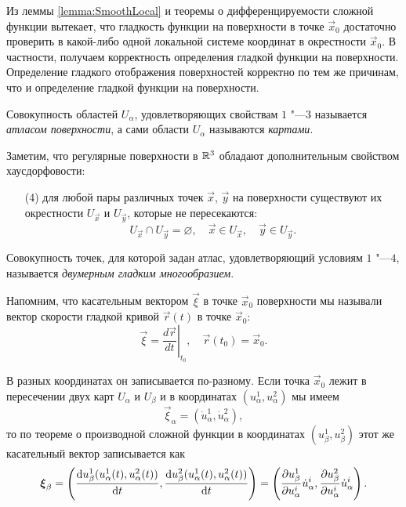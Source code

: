 Из леммы \ref{lemma:SmoothLocal} и теоремы о дифференцируемости сложной функции вытекает, что гладкость функции на поверхности в точке $\vec{x}_0$ достаточно проверить в какой-либо одной локальной системе координат в окрестности $\vec{x}_0$. В частности, получаем корректность определения гладкой функции на поверхности. Определение гладкого отображения поверхностей корректно по тем же причинам, что и определение гладкой функции на поверхности.

\begin{definition}
	Совокупность областей $U_\alpha$, удовлетворяющих свойствам $1$ "---$3$ называется \textit{атласом поверхности}, а сами области $U_\alpha$ называются \textit{картами}.
\end{definition}

Заметим, что регулярные поверхности в $\mathbb{R}^3$ обладают дополнительным свойством хаусдорфовости:
\begin{enumerate}[nolistsep, label=(\arabic*)]
	\item[(4)] для любой пары различных точек $\vec{x}$, $\vec{y}$ на поверхности существуют их окрестности $U_{\vec{x}}$ и $U_{\vec{y}}$, которые не пересекаются:
		\[
			U_{\vec{x}} \cap U_{\vec{y}} = \varnothing,\quad \vec{x} \in U_{\vec{x}},\quad \vec{y} \in U_{\vec{y}}.
		\]
\end{enumerate}

\begin{definition}
	Совокупность точек, для которой задан атлас, удовлетворяющий условиям $1$ "---$4$, называется \textit{двумерным гладким многообразием}.
\end{definition}

Напомним, что касательным вектором $\vec{\xi}$ в точке $\vec{x}_0$ поверхности мы называли вектор скорости гладкой кривой $\vec{r}(t)$ в точке $\vec{x}_0$:
\[
	\vec{\xi} = \left.\frac{d\vec{r}}{dt}\right|_{t_0},\quad \vec{r}(t_0) = \vec{x}_0.
\]

В разных координатах он записывается по-разному. Если точка $\vec{x}_0$ лежит в пересечении двух карт $U_\alpha$ и $U_\beta$ и в координатах $(u_\alpha^1, u_\alpha^2)$ мы имеем
\[
	\vec{\xi}_\alpha = (\dot{u}^1_\alpha, \dot{u}^2_\alpha),
\]
то по теореме о производной сложной функции в координатах $(u_\beta^1, u_\beta^2)$ этот же касательный вектор записывается как
\[
	\boldsymbol{\xi}_\beta = \left(\frac{\mathop{}\!\mathrm{d} u_\beta^1(u_\alpha^1(t), u_\alpha^2(t))}{\mathop{}\!\mathrm{d} t}, \frac{\mathop{}\!\mathrm{d} u_\beta^2(u_\alpha^1(t), u_\alpha^2(t))}{\mathop{}\!\mathrm{d} t}\right) = \left(\frac{\partial u_\beta^1}{\partial u^i_\alpha}\dot{u}_\alpha^i, \frac{\partial u_\beta^2}{\partial u^i_\alpha}\dot{u}_\alpha^i\right).
\]

